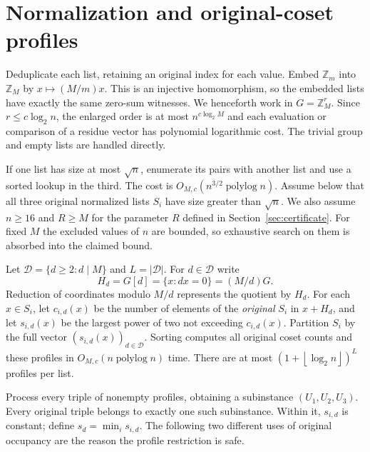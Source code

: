 \documentclass[acmsmall,11pt,nonacm,natbib=false]{acmart}
\newcommand{\Z}{\mathbb Z}
\newcommand{\polylog}{\operatorname{polylog}}
\newcommand{\floor}[1]{\left\lfloor #1\right\rfloor}
\begin{document}
\section{Normalization and original-coset profiles}\label{sec:profiles}

Deduplicate each list, retaining an original index for each value. Embed
$\Z_m$ into $\Z_M$ by $x\mapsto (M/m)x$. This is an injective
homomorphism, so the embedded lists have exactly the same zero-sum
witnesses. We henceforth work in $G=\Z_M^r$. Since $r\le c\log_2 n$, the
enlarged order is at most $n^{c\log_2 M}$ and each evaluation or comparison
of a residue vector has polynomial logarithmic cost. The trivial group and
empty lists are handled directly.

If one list has size at most $\sqrt n$, enumerate its pairs with another
list and use a sorted lookup in the third. The cost is
$O_{M,c}(n^{3/2}\polylog n)$. Assume below that all three original normalized
lists $S_i$ have size greater than $\sqrt n$. We also assume $n\ge16$ and
$R\ge M$ for the parameter $R$ defined in Section~\ref{sec:certificate}.
For fixed $M$ the excluded values of $n$ are bounded, so exhaustive search
on them is absorbed into the claimed bound.

Let $\mathcal D=\{d\ge2:d\mid M\}$ and $L=|\mathcal D|$. For $d\in\mathcal D$
write
\[
 H_d=G[d]=\{x:dx=0\}=(M/d)G.
\]
Reduction of coordinates modulo $M/d$ represents the quotient by $H_d$.
For each $x\in S_i$, let $c_{i,d}(x)$ be the number of elements of the
\emph{original} $S_i$ in $x+H_d$, and let $s_{i,d}(x)$ be the largest power
of two not exceeding $c_{i,d}(x)$. Partition $S_i$ by the full vector
$(s_{i,d}(x))_{d\in\mathcal D}$. Sorting computes all original coset counts
and these profiles in $O_{M,c}(n\polylog n)$ time. There are at most
$(1+\floor{\log_2 n})^L$ profiles per list.

Process every triple of nonempty profiles, obtaining a subinstance
$(U_1,U_2,U_3)$. Every original triple belongs to exactly one such subinstance.
Within it, $s_{i,d}$ is constant; define $s_d=\min_i s_{i,d}$. The following
two different uses of original occupancy are the reason the profile
restriction is safe.
\end{document}
